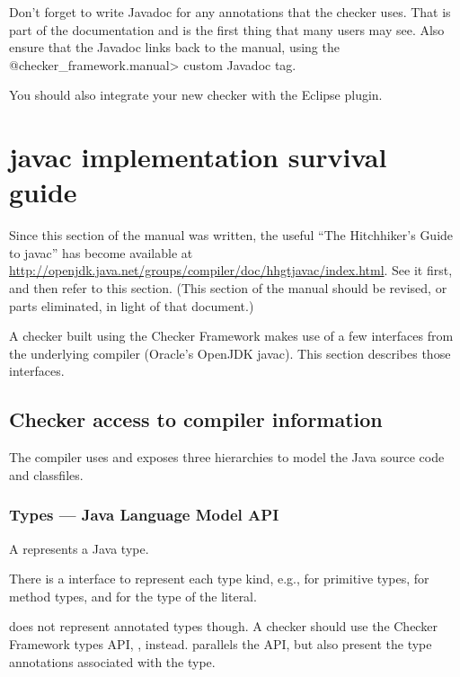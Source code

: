 Don't forget to write Javadoc for any annotations that the checker uses.
That is part of the documentation and is the first thing that many users
may see.  Also ensure that the Javadoc links back to the manual, using the
\<@checker\_framework.manual> custom Javadoc tag.

You should also integrate your new checker with the Eclipse plugin.


\section{javac implementation survival guide\label{javac-tips}}

Since this section of the manual was written, the useful ``The Hitchhiker's
Guide to javac'' has become available at
\url{http://openjdk.java.net/groups/compiler/doc/hhgtjavac/index.html}.
See it first, and then refer to this section.  (This section of the manual
should be revised, or parts eliminated, in light of that document.)


A checker built using the Checker Framework makes use of a few interfaces
from the underlying compiler (Oracle's OpenJDK javac).
This section describes those interfaces.




\subsection{Checker access to compiler information\label{compiler-information}}

The compiler uses and exposes three hierarchies to model the Java
source code and classfiles.


\subsubsection{Types --- Java Language Model API\label{javac-types}}

A  represents a Java type.

\begin{sloppypar}
There is a  interface to represent each type kind,
e.g.,  for primitive types, 
for method types, and  for the type of the  literal.
\end{sloppypar}

 does not represent annotated types though.  A checker
should use the Checker Framework types API,
, instead.  
parallels the  API, but also present the type annotations
associated with the type.

